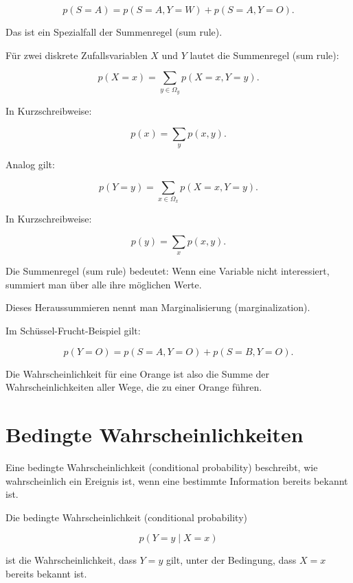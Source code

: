 \[
    p(S=A)
    =
    p(S=A,Y=W)
    +
    p(S=A,Y=O).
\]

Das ist ein Spezialfall der Summenregel (sum rule).

\begin{definitionbox}
Für zwei diskrete Zufallsvariablen \(X\) und \(Y\) lautet die Summenregel (sum rule):

\[
    p(X=x)
    =
    \sum_{y \in \Omega_y}
    p(X=x,Y=y).
\]

In Kurzschreibweise:

\[
    p(x)
    =
    \sum_y p(x,y).
\]
\end{definitionbox}

Analog gilt:

\[
    p(Y=y)
    =
    \sum_{x \in \Omega_x}
    p(X=x,Y=y).
\]

In Kurzschreibweise:

\[
    p(y)
    =
    \sum_x p(x,y).
\]

\begin{conceptbox}
Die Summenregel (sum rule) bedeutet:
Wenn eine Variable nicht interessiert, summiert man über alle ihre möglichen Werte.

Dieses Heraussummieren nennt man Marginalisierung (marginalization).
\end{conceptbox}

\begin{examplebox}
Im Schüssel-Frucht-Beispiel gilt:

\[
    p(Y=O)
    =
    p(S=A,Y=O)
    +
    p(S=B,Y=O).
\]

Die Wahrscheinlichkeit für eine Orange ist also die Summe der Wahrscheinlichkeiten aller Wege, die zu einer Orange führen.
\end{examplebox}

\section{Bedingte Wahrscheinlichkeiten}

Eine bedingte Wahrscheinlichkeit (conditional probability) beschreibt, wie wahrscheinlich ein Ereignis ist, wenn eine bestimmte Information bereits bekannt ist.

\begin{definitionbox}
Die bedingte Wahrscheinlichkeit (conditional probability)

\[
    p(Y=y \mid X=x)
\]

ist die Wahrscheinlichkeit, dass \(Y=y\) gilt, unter der Bedingung, dass \(X=x\) bereits bekannt ist.
\end{definitionbox}

